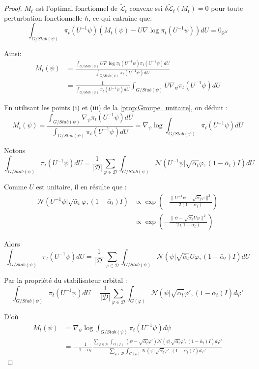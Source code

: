 \documentclass[a4paper,10pt]{article}
\theoremstyle{definition} %
\theoremstyle{definition} %
\theoremstyle{definition} %
\theoremstyle{definition} %
\begin{document}
\begin{proof}
$M_t$ est l'optimal fonctionnel de $\widetilde{\mathcal{L}}_t$ convexe ssi $\delta \widetilde{\mathcal{L}}_t(M_t) = 0$ pour toute perturbation fonctionnelle $h$, ce qui entraîne que:
\[
\int_{G/Stab(\psi)} \pi_t(U^{-1}\psi) (M_t(\psi) - U\nabla \log \pi_t(U^{-1}\psi)) dU = 0_{\mathbb{R}^N}
\]

Ainsi:
\begin{align*}
    M_t(\psi) &= \frac{\int_{G/Stab(\psi)} U\nabla \log \pi_t(U^{-1}\psi) \pi_t(U^{-1}\psi) dU}{\int_{G/Stab(\psi)} \pi_t(U^{-1}\psi) dU} \\
    &= \frac{1}{\int_{G/Stab(\psi)} \pi_t(U^{-1}\psi) dU} \int_{G/Stab(\psi)} U \nabla_\psi \pi_t(U^{-1}\psi) dU
\end{align*}


En utilisant les points (i) et (iii) de la \cref{prop:Groupe_unitaire}, on déduit :
\[
M_t(\psi) = \frac{\int_{G/Stab(\psi)} \nabla_\psi \pi_t(U^{-1}\psi) dU}{\int_{G/Stab(\psi)} \pi_t(U^{-1}\psi) dU} = \nabla_\psi \log \int_{G/Stab(\psi)} \pi_t(U^{-1}\psi) dU
\]

Notons
\[
\int_{G/Stab(\psi)} \pi_t(U^{-1}\psi) dU = \frac{1}{|\mathcal{D}|} \sum\limits_{\varphi \in \mathcal{D}} \int_{G/Stab(\psi)} \mathcal{N}(U^{-1}\psi | \sqrt{\bar \alpha_t} \varphi, (1-\bar \alpha_t) I) dU
\]

Comme $U$ est unitaire, il en résulte que :
\begin{align*}
    \mathcal{N}(U^{-1}\psi | \sqrt{\bar \alpha_t} \varphi, (1-\bar \alpha_t) I) &\propto \exp \left( -\frac{\|U^{-1}\psi - \sqrt{\bar \alpha_t} \varphi\|^2}{2(1-\bar \alpha_t)} \right) \\
    & \propto \exp \left( -\frac{\|\psi - \sqrt{\bar \alpha_t} U \varphi\|^2}{2(1-\bar \alpha_t)} \right)
\end{align*}




Alors
\[
\int_{G/Stab(\psi)} \pi_t(U^{-1}\psi) dU = \frac{1}{|\mathcal{D}|} \sum\limits_{\varphi \in \mathcal{D}} \int_{G/Stab(\psi)} \mathcal{N}(\psi | \sqrt{\bar \alpha_t} U \varphi, (1-\bar \alpha_t) I) dU
\]

Par la propriété du stabilisateur orbital :
\[
\int_{G/Stab(\psi)} \pi_t(U^{-1}\psi) dU = \frac{1}{|\mathcal{D}|} \sum\limits_{\varphi \in \mathcal{D}} \int_{G(\varphi)} \mathcal{N}(\psi | \sqrt{\bar \alpha_t} \varphi', (1-\bar \alpha_t) I) d\varphi'
\]

D'où
\begin{align*}
    M_t(\psi) &= \nabla_\psi \log \int_{G/Stab(\psi)} \pi_t(U^{-1}\psi) d\psi\\
    &= -\frac{1}{1-\bar \alpha_t} \frac{\sum\limits_{\varphi \in \mathcal{D}} \int_{G(\varphi)} (\psi - \sqrt{\bar \alpha_t} \varphi') \mathcal{N}(\psi | \sqrt{\bar \alpha_t} \varphi', (1-\bar \alpha_t) I) d\varphi'}{\sum\limits_{\varphi \in \mathcal{D}} \int_{G(\varphi)} \mathcal{N}(\psi | \sqrt{\bar \alpha_t} \varphi', (1-\bar \alpha_t) I) d\varphi'}
\end{align*}
\end{proof}
\end{document}
